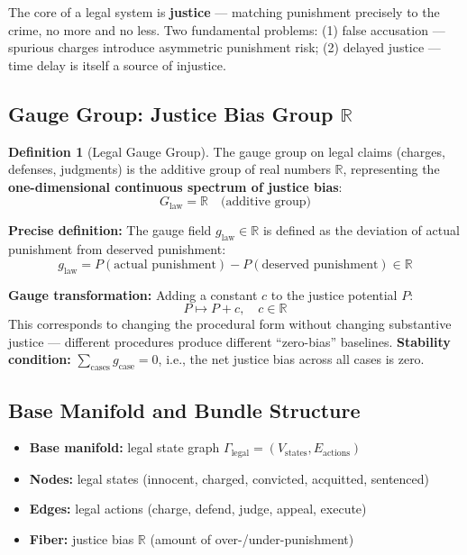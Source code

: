 \documentclass[12pt,a4paper]{article}
\theoremstyle{plain}
\theoremstyle{definition}
\newtheorem{definition}[theorem]{Definition}
\newcommand{\R}{\mathbb{R}}
\begin{document}
The core of a legal system is \textbf{justice} — matching punishment precisely to the crime, no more and no less.
Two fundamental problems: (1) false accusation — spurious charges introduce asymmetric punishment risk;
(2) delayed justice — time delay is itself a source of injustice.

\subsection{Gauge Group: Justice Bias Group $\R$}

\begin{definition}[Legal Gauge Group]
The gauge group on legal claims (charges, defenses, judgments) is the additive group of real numbers $\R$, representing the \textbf{one-dimensional continuous spectrum of justice bias}:
\begin{equation}
    G_{\text{law}} = \R \quad \text{(additive group)}
\end{equation}

\textbf{Precise definition:} The gauge field $g_{\text{law}} \in \R$ is defined as the deviation of actual punishment from deserved punishment:
\begin{equation}
    g_{\text{law}} = P(\text{actual punishment}) - P(\text{deserved punishment}) \in \R
\end{equation}

\textbf{Gauge transformation:} Adding a constant $c$ to the justice potential $P$:
\begin{equation}
    P \mapsto P + c, \quad c \in \R
\end{equation}
This corresponds to changing the procedural form without changing substantive justice — different procedures produce different ``zero-bias'' baselines.
\textbf{Stability condition:} $\sum_{\text{cases}} g_{\text{case}} = 0$, i.e., the net justice bias across all cases is zero.
\end{definition}

\subsection{Base Manifold and Bundle Structure}

\begin{itemize}
    \item \textbf{Base manifold:} legal state graph $\Gamma_{\text{legal}} = (V_{\text{states}}, E_{\text{actions}})$
    \item \textbf{Nodes:} legal states (innocent, charged, convicted, acquitted, sentenced)
    \item \textbf{Edges:} legal actions (charge, defend, judge, appeal, execute)
    \item \textbf{Fiber:} justice bias $\R$ (amount of over-/under-punishment)
\end{itemize}
\end{document}
